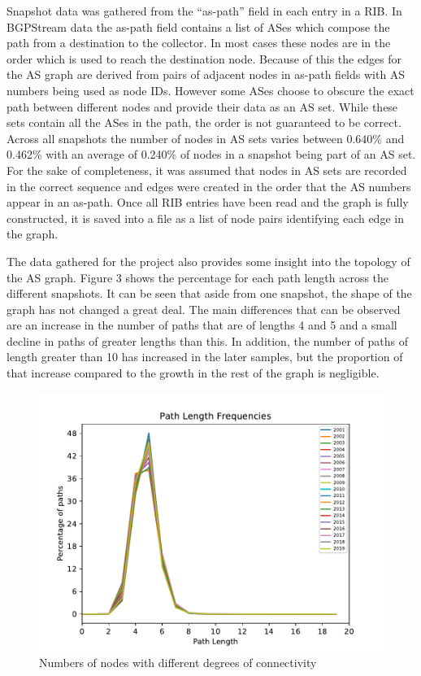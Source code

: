 \documentclass{mpaper}
\begin{document}
Snapshot data was gathered from the ``as-path'' field in each entry in a RIB. In BGPStream data the as-path field contains a list of ASes which compose the path from a destination to the collector. In most cases these nodes are in the order which is used to reach the destination node. Because of this the edges for the AS graph are derived from pairs of adjacent nodes in as-path fields with AS numbers being used as node IDs. However some ASes choose to obscure the exact path between different nodes and provide their data as an AS set. While these sets contain all the ASes in the path, the order is not guaranteed to be correct. Across all snapshots the number of nodes in AS sets varies between 0.640\% and 0.462\% with an average of 0.240\% of nodes in a snapshot being part of an AS set. For the sake of completeness, it was assumed that nodes in AS sets are recorded in the correct sequence and edges were created in the order that the AS numbers appear in an as-path. Once all RIB entries have been read and the graph is fully constructed, it is saved into a file as a list of node pairs identifying each edge in the graph.

The data gathered for the project also provides some insight into the topology of the AS graph. Figure 3 shows the percentage for each path length across the different snapshots. It can be seen that aside from one snapshot, the shape of the graph has not changed a great deal. The main differences that can be observed are an increase in the number of paths that are of lengths 4 and 5 and a small decline in paths of greater lengths than this. In addition, the number of paths of length greater than 10 has increased in the later samples, but the proportion of that increase compared to the growth in the rest of the graph is negligible. 

\begin{figure}
    \centering
    \includegraphics{images/path-frequencies.pdf}
    \caption{Numbers of nodes with different degrees of connectivity}
    \captionsetup{justification=centering}
\end{figure}
\end{document}
